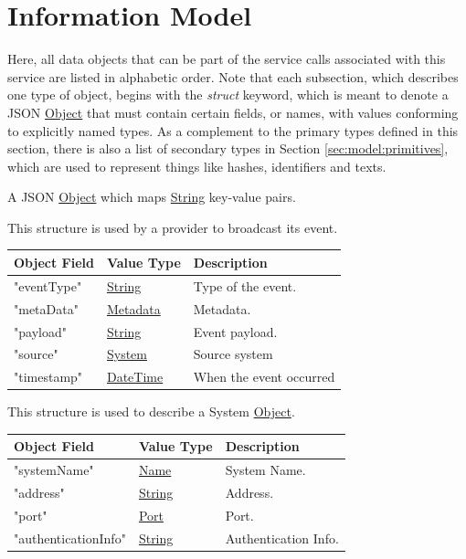 \documentclass[a4paper]{arrowhead}
\newcommand{\pref}[1]{{\textcolor{ArrowheadGrey}{\hyperref[sec:model:primitives:#1]{#1}}}}
\begin{document}
\section{Information Model}
\label{sec:model}

Here, all data objects that can be part of the service calls associated with this service are listed in alphabetic order.
Note that each subsection, which describes one type of object, begins with the \textit{struct} keyword, which is meant to denote a JSON \pref{Object} that must contain certain fields, or names, with values conforming to explicitly named types.
As a complement to the primary types defined in this section, there is also a list of secondary types in Section \ref{sec:model:primitives}, which are used to represent things like hashes, identifiers and texts.


A JSON \pref{Object} which maps \pref{String} key-value pairs.


This structure is used by a provider to broadcast its event.

\begin{table}[ht!]
\begin{tabularx}{\textwidth}{| p{5cm} | p{5cm} | X |} \hline
\rowcolor{gray!33} Object Field & Value Type      & Description \\ \hline
"eventType"  & \pref{String}    & Type of the event. \\ \hline
"metaData"   & \pref{Metadata}  & Metadata. \\ \hline
"payload"    & \pref{String}    & Event payload. \\ \hline
"source"     & \pref{System}    & Source system \\ \hline
"timestamp"  & \pref{DateTime}  & When the event occurred \\ \hline
\end{tabularx}
\end{table}


This structure is used to describe a System \pref{Object}. 

\begin{table}[ht!]
\begin{tabularx}{\textwidth}{| p{5cm} | p{6cm} | X |} \hline
\rowcolor{gray!33} Object Field & Value Type                      & Description \\ \hline
"systemName"         & \pref{Name}     & System Name. \\ \hline
"address"            & \pref{String}   & Address. \\ \hline
"port"               & \pref{Port}     & Port. \\ \hline
"authenticationInfo" & \pref{String}   & Authentication Info. \\ \hline
\end{tabularx}
\end{table}
\end{document}
